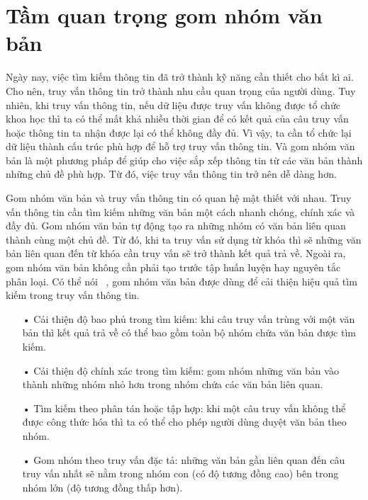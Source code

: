 \section{Tầm quan trọng gom nhóm văn bản}
Ngày nay, việc tìm kiếm thông tin đã trở thành kỹ năng cần thiết cho bất kì ai.
Cho nên, truy vấn thông tin trở thành nhu cầu quan trọng của người dùng.
Tuy nhiên, khi truy vấn thông tin, nếu dữ liệu được truy vấn không được tổ chức khoa học thì ta có thể mất khá nhiều thời gian để có kết quả của câu truy vấn hoặc thông tin ta nhận được lại có thể không đầy đủ.
Vì vậy, ta cần tổ chức lại dữ liệu thành cấu trúc phù hợp để hỗ trợ truy vấn thông tin.
Và gom nhóm văn bản là một phương pháp để giúp cho việc sắp xếp thông tin từ các văn bản thành những chủ đề phù hợp.
Từ đó, việc truy vấn thông tin trở nên dễ dàng hơn.

Gom nhóm văn bản và truy vấn thông tin có quan hệ mật thiết với nhau.
Truy vấn thông tin cần tìm kiếm những văn bản một cách nhanh chóng, chính xác và đầy đủ.
Gom nhóm văn bản tự động tạo ra những nhóm có văn bản liên quan thành cùng một chủ đề.
Từ đó, khi ta truy vấn sử dụng từ khóa thì sẽ những văn bản liên quan đến từ khóa cần truy vấn sẽ trở thành kết quả trả về.
Ngoài ra, gom nhóm văn bản không cần phải tạo trước tập huấn luyện hay nguyên tắc phân loại.
Có thể nói ~\cite{text-clustering}, gom nhóm văn bản được dùng để cải thiện hiệu quả tìm kiếm trong truy vấn thông tin.
\begin{enumerate}
\item[•]Cải thiện độ bao phủ trong tìm kiếm: khi câu truy vấn trùng với một văn bản thì kết quả trả về có thể bao gồm toàn bộ nhóm chứa văn bản được tìm kiếm.
\item[•]Cải thiện độ chính xác trong tìm kiếm: gom nhóm những văn bản vào thành những nhóm nhỏ hơn trong nhóm chứa các văn bản liên quan.
\item[•]Tìm kiếm theo phân tán hoặc tập hợp: khi một câu truy vấn không thể được công thức hóa thì ta có thể cho phép người dùng duyệt văn bản theo nhóm.
\item[•]Gom nhóm theo truy vấn đặc tả: những văn bản gần liên quan đến câu truy vấn nhất sẽ nằm trong nhóm con (có độ tương đồng cao) bên trong nhóm lớn (độ tương đồng thấp hơn).
\end{enumerate}

